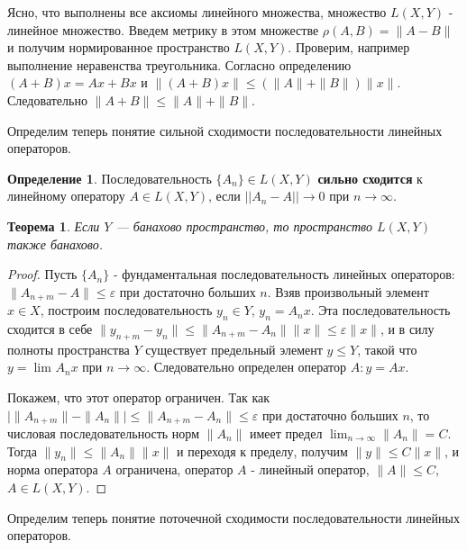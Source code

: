 \documentclass[12pt,a4paper,titlepage, oneside]{book}
\theoremstyle{definition}
\newtheorem*{definition}{Определение}
\theoremstyle{plain}
\newtheorem*{theorem}{Теорема}
\theoremstyle{remark}
\theoremstyle{remark}
\theoremstyle{remark}
\theoremstyle{remark}
\theoremstyle{plain}
\theoremstyle{plain}
\begin{document}
Ясно, что выполнены все аксиомы линейного множества, множество $L(X,Y)$ - линейное множество. Введем метрику в этом множестве $\rho(A, B) = \parallel A-B\parallel$ и получим нормированное пространство $L(X,Y)$. Проверим, например выполнение неравенства треугольника. Согласно определению $(A+B)x = Ax+Bx$ и $\parallel(A+B)x\parallel\le(\parallel A\parallel+\parallel B\parallel)\parallel x\parallel$. Следовательно $\parallel A+B\parallel\le\parallel A\parallel+\parallel B\parallel$.

Определим теперь понятие сильной сходимости последовательности линейных операторов.

\begin{definition}
Последовательность $\{A_n\}\in L(X,Y)$ \textbf{сильно сходится} к линейному оператору $A\in L(X,Y)$, если $||A_n-A||\to 0$ при $n\to {\infty}$.
\end{definition}

\begin{theorem}
Если $Y$ --- банахово пространство, то пространство $L(X,Y)$ также банахово.
\end{theorem}

\begin{proof}
Пусть $\{A_n\}$ - фундаментальная последовательность линейных операторов: $\parallel A_{n+m}-A\parallel\le \varepsilon$ при достаточно больших $n$. Взяв произвольный элемент $x\in X$, построим последовательность $y_n\in Y$, $y_n=A_nx$. Эта последовательность сходится в себе $\parallel y_{n+m}-y_n\parallel\le \parallel A_{n+m}-A_n\parallel \parallel x\parallel\le \varepsilon \parallel x\parallel$, и в силу полноты пространства $Y$ существует предельный элемент $y\le Y$, такой что $y=\lim_{} A_nx$ при $n \to \infty$. Следовательно определен оператор $A: y=Ax$.

Покажем, что этот оператор ограничен. Так как $\lvert \parallel A_{n+m} \parallel-\parallel A_n\parallel \rvert \le \parallel A_{n+m}-A_n\parallel \le \varepsilon$ при достаточно больших $n$, то числовая последовательность норм $\parallel A_n\parallel$ имеет предел $\lim_{n\to \infty} \parallel A_n\parallel=C$. Тогда $\parallel y_n\parallel\le\parallel A_n\parallel \parallel x\parallel$ и переходя к пределу, получим $\parallel y\parallel\le C\parallel x\parallel$, и норма оператора $A$ ограничена, оператор $A$ - линейный оператор, $\parallel A\parallel\le C$, $A\in L(X,Y)$.
\end{proof}

Определим теперь понятие поточечной сходимости последовательности линейных операторов.
\end{document}
